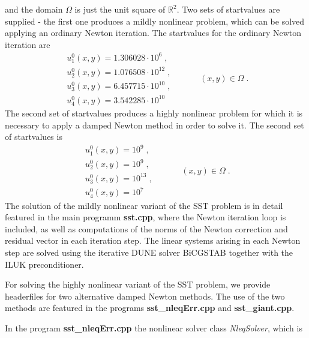 \documentclass[11pt]{article}
\begin{document}
and the domain $\Omega$ is just the unit square of $\mathbb{R}^2$. Two sets of startvalues are supplied - the first one produces a mildly nonlinear problem, which can be solved applying an ordinary Newton iteration. The startvalues for the ordinary Newton iteration are
\begin{equation}  \label{SSTstartMildly}
\begin{array}{l}
    u_1^0(x,y) = 1.306028\cdot 10^{6}   \;  ,  \\[2mm]
    u_2^0(x,y) = 1.076508\cdot 10^{12}   \;  ,  \\[2mm]
    u_3^0(x,y) = 6.457715\cdot 10^{10}   \;  ,  \\[2mm]
    u_4^0(x,y) = 3.542285\cdot 10^{10}
  \end{array} \hspace{3em} (x,y)\in \Omega \; . 
\end{equation}
The second set of startvalues produces a highly nonlinear problem for which it is necessary to apply a damped Newton method in order to solve it. The second set of startvalues is
\begin{equation}  \label{SSTstartHighly}
\begin{array}{l}
    u_1^0(x,y) = 10^9   \;  ,  \\[2mm]
    u_2^0(x,y) = 10^9   \;  ,  \\[2mm]
    u_3^0(x,y) = 10^{13}   \;  ,  \\[2mm]
    u_4^0(x,y) = 10^7
  \end{array} \hspace{3em} (x,y)\in \Omega \; . 
\end{equation}
The solution of the mildly nonlinear variant of the SST problem is in detail featured in the main programm
{\bf sst.cpp}, where the Newton iteration loop is included, as well as computations of the norms of the Newton
correction and residual vector in each iteration step. The linear systems arising in each Newton step are
solved using the iterative DUNE solver BiCGSTAB together with the ILUK preconditioner.  \par
For solving the highly nonlinear variant of the SST problem, we provide headerfiles for two alternative
damped Newton methods. The use of the two methods are featured in the programs {\bf sst\_nleqErr.cpp} and
{\bf sst\_giant.cpp}. \par
In the program {\bf sst\_nleqErr.cpp} the nonlinear solver class {\em NleqSolver}, which is
\end{document}
